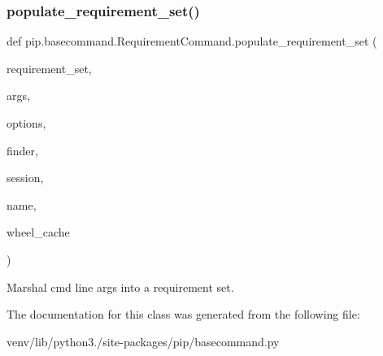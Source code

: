 \subsubsection{\texorpdfstring{populate\+\_\+requirement\+\_\+set()}{populate\_requirement\_set()}}
{\footnotesize\ttfamily def pip.\+basecommand.\+Requirement\+Command.\+populate\+\_\+requirement\+\_\+set (\begin{DoxyParamCaption}\item[{}]{requirement\+\_\+set,  }\item[{}]{args,  }\item[{}]{options,  }\item[{}]{finder,  }\item[{}]{session,  }\item[{}]{name,  }\item[{}]{wheel\+\_\+cache }\end{DoxyParamCaption})\hspace{0.3cm}{\ttfamily [static]}}

\begin{DoxyVerb}Marshal cmd line args into a requirement set.
\end{DoxyVerb}
 

The documentation for this class was generated from the following file\+:\begin{DoxyCompactItemize}
\item 
venv/lib/python3./site-\/packages/pip/basecommand.\+py\end{DoxyCompactItemize}

